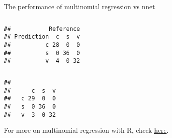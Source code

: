 \documentclass[10pt,ignorenonframetext,]{beamer}
\newenvironment{Shaded}{\begin{snugshade}}{\end{snugshade}}
\newcommand{\DataTypeTok}[1]{\textcolor[rgb]{0.13,0.29,0.53}{#1}}
\newcommand{\KeywordTok}[1]{\textcolor[rgb]{0.13,0.29,0.53}{\textbf{#1}}}
\newcommand{\NormalTok}[1]{#1}
\newcommand{\OperatorTok}[1]{\textcolor[rgb]{0.81,0.36,0.00}{\textbf{#1}}}
\newcommand{\StringTok}[1]{\textcolor[rgb]{0.31,0.60,0.02}{#1}}
\begin{document}
\begin{frame}[fragile]

\begin{block}{The performance of multinomial regression vs nnet}

\(~\)

\scriptsize

\begin{Shaded}
\end{Shaded}

\begin{verbatim}
##           Reference
## Prediction  c  s  v
##          c 28  0  0
##          s  0 36  0
##          v  4  0 32
\end{verbatim}

\(~\)

\begin{Shaded}
\end{Shaded}

\begin{verbatim}
##    
##      c  s  v
##   c 29  0  0
##   s  0 36  0
##   v  3  0 32
\end{verbatim}

\end{block}

\end{frame}

\begin{frame}

For more on multinomial regression with R, check
\href{https://www.r-bloggers.com/\%F0\%9F\%93\%8A-multinomial-regression-in-r/}{here}.

\end{frame}
\end{document}
